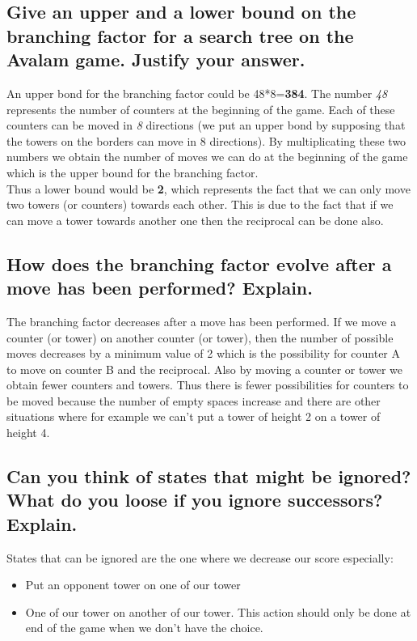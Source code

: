 \documentclass[10pt,a4paper]{article}
\begin{document}
\subsection{Give an upper and a lower bound on the branching factor for a search tree on the Avalam game. Justify your answer.}

An upper bond for the branching factor could be 48*8=\textbf{384}. The number \textit{48} represents the number of counters at the beginning of the game. Each of these counters can be moved in \textit{8} directions (we put an upper bond by supposing that the towers on the borders can move in 8 directions). By multiplicating these two numbers we obtain the number of moves we can do at the beginning of the game which is the upper bound for the branching factor. \\

Thus a lower bound would be \textbf{2}, which represents the fact that we can only move two towers (or counters) towards each other. This is due to the fact that if we can move a tower towards another one then the reciprocal can be done also. 

\subsection{How does the branching factor evolve after a move has been performed? Explain.}

The branching factor decreases after a move has been performed. If we move a counter (or tower) on another counter (or tower), then the number of possible moves decreases by a minimum value of 2 which is the possibility for counter A to move on counter B and the reciprocal. Also by moving a counter or tower we obtain fewer counters and towers. Thus there is fewer possibilities for counters to be moved because the number of empty spaces increase and there are other situations where for example we can't put a tower of height 2 on a tower of height 4.

\subsection{Can you think of states that might be ignored? What do you loose if you ignore successors? Explain.}

States that can be ignored are the one where we decrease our score especially:
\begin{itemize}
\item Put an opponent tower on one of our tower
\item One of our tower on another of our tower. This action should only be done at end of the game when we don't have the choice.
\end{itemize}
\end{document}
